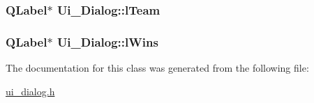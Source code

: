 \subsubsection[{l\+Team}]{\setlength{\rightskip}{0pt plus 5cm}Q\+Label$\ast$ Ui\+\_\+\+Dialog\+::l\+Team}\label{class_ui___dialog_a4419be090ba293f0442cce11fefde939}
\hypertarget{class_ui___dialog_a33a17f4fc1e7dde797d5cce1d08f4843}{}
\subsubsection[{l\+Wins}]{\setlength{\rightskip}{0pt plus 5cm}Q\+Label$\ast$ Ui\+\_\+\+Dialog\+::l\+Wins}\label{class_ui___dialog_a33a17f4fc1e7dde797d5cce1d08f4843}


The documentation for this class was generated from the following file\+:\begin{DoxyCompactItemize}
\item 
\hyperlink{ui__dialog_8h}{ui\+\_\+dialog.\+h}\end{DoxyCompactItemize}
